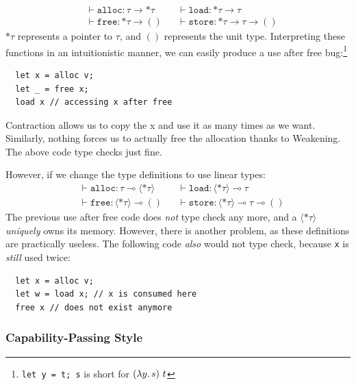 \documentclass[sigplan,11pt,screen,nonacm]{acmart}
\begin{document}
\begin{align*}
  &\vdash \texttt{alloc} : \tau \rightarrow *\tau &
  &\vdash \texttt{load} : *\tau \rightarrow \tau \\
  &\vdash \texttt{free} : *\tau \rightarrow () &
  &\vdash \texttt{store} : *\tau \rightarrow \tau \rightarrow ()
\end{align*}
\(*\tau\) represents a pointer to \(\tau\), and \(()\) represents the unit type. Interpreting these functions in an intuitionistic manner, we can easily produce a use after free bug:\footnote{\texttt{let y = t; s} is short for \((\lambda y\ldotp s)\ t\)}
\begin{verbatim}
  let x = alloc v;
  let _ = free x;
  load x // accessing x after free
\end{verbatim}

Contraction allows us to copy the x and use it as many times as we want. Similarly, nothing forces us to actually free the allocation thanks to Weakening. The above code type checks just fine.

However, if we change the type definitions to use linear types:
\begin{align*}
  &\vdash \texttt{alloc} : \tau \multimap \langle *\tau\rangle &
  &\vdash \texttt{load} : \langle *\tau\rangle \multimap \tau \\
  &\vdash \texttt{free} : \langle *\tau\rangle \multimap () &
  &\vdash \texttt{store} : \langle *\tau\rangle \multimap \tau \multimap ()
\end{align*}
The previous use after free code does \emph{not} type check any more, and a \(\langle *\tau\rangle\) \emph{uniquely} owns its memory. However, there is another problem, as these definitions are practically useless. The following code \emph{also} would not type check, because \texttt{x} is \emph{still} used twice:
\begin{verbatim}
  let x = alloc v;
  let w = load x; // x is consumed here
  free x // does not exist anymore
\end{verbatim}

\subsubsection{Capability-Passing Style} \label{sec:theory:capability-passing-style}
\end{document}
